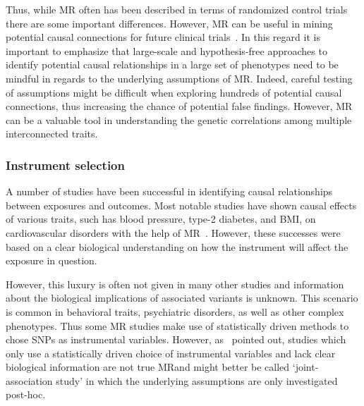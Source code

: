 Thus, while MR often has been described in terms of randomized control trials there are some important differences.
However, MR can be useful in mining potential causal connections for future clinical trials~\cite{Evans2015}. 
In this regard it is important to emphasize that large-scale and hypothesis-free approaches to identify potential causal relationships in a large set of phenotypes need to be mindful in regards to the underlying assumptions of MR\@.
Indeed, careful testing of assumptions might be difficult when exploring hundreds of potential causal connections,
thus increasing the chance of potential false findings.
However, MR can be a valuable tool in understanding the genetic correlations among multiple interconnected traits. 

\subsubsection{Instrument selection}
\label{ssub:instrument_selection}

A number of studies have been successful in identifying causal relationships between exposures and outcomes.
Most notable studies have shown causal effects of various traits, such has blood pressure, type-2 diabetes, and BMI, on cardiovascular disorders with the help of MR~\cite{Swerdlow,Ference2015,Lieb2013,Voight2012a}.
However, these successes were based on a clear biological understanding on how the instrument will affect the exposure in question.

However, this luxury is often not given in many other studies and information about the biological implications of associated variants is unknown.
This scenario is common in behavioral traits, psychiatric disorders, as well as other complex phenotypes.
Thus some MR studies make use of statistically driven methods to chose SNPs as instrumental variables.
However, as~\citet{Burgess2016a} pointed out, studies which only use a statistically driven choice of instrumental variables and lack clear biological information are not true MR\@ and might better be called `joint-association study' in which the underlying assumptions are only investigated post-hoc.

